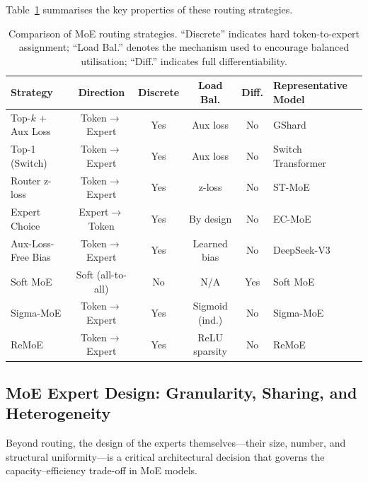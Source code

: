 Table~\ref{tab:routing_comparison} summarises the key properties of these routing strategies.

\begin{table}[t]
\centering
\caption{Comparison of MoE routing strategies. ``Discrete'' indicates hard token-to-expert assignment; ``Load Bal.'' denotes the mechanism used to encourage balanced utilisation; ``Diff.'' indicates full differentiability.}
\label{tab:routing_comparison}
\small
\begin{tabular}{lccccl}
\hline
\textbf{Strategy} & \textbf{Direction} & \textbf{Discrete} & \textbf{Load Bal.} & \textbf{Diff.} & \textbf{Representative Model} \\
\hline
Top-$k$ + Aux Loss   & Token$\to$Expert & Yes & Aux loss       & No  & GShard~\cite{lepikhin2020gshard} \\
Top-1 (Switch)        & Token$\to$Expert & Yes & Aux loss       & No  & Switch Transformer~\cite{fedus2022switch} \\
Router z-loss         & Token$\to$Expert & Yes & z-loss         & No  & ST-MoE~\cite{zoph2022stmoe} \\
Expert Choice         & Expert$\to$Token & Yes & By design      & No  & EC-MoE~\cite{zhou2022mixture} \\
Aux-Loss-Free Bias    & Token$\to$Expert & Yes & Learned bias   & No  & DeepSeek-V3~\cite{liu2024deepseek} \\
Soft MoE              & Soft (all-to-all) & No  & N/A           & Yes & Soft MoE~\cite{puigcerver2024soft} \\
Sigma-MoE             & Token$\to$Expert & Yes & Sigmoid (ind.) & No  & Sigma-MoE~\cite{hu2024sigma} \\
ReMoE                 & Token$\to$Expert & Yes & ReLU sparsity  & No  & ReMoE~\cite{wang2024remoe} \\
\hline
\end{tabular}
\end{table}


\subsection{MoE Expert Design: Granularity, Sharing, and Heterogeneity}
\label{subsec:moe_expert_design}

Beyond routing, the design of the experts themselves---their size, number, and structural uniformity---is a critical architectural decision that governs the capacity--efficiency trade-off in MoE models.

